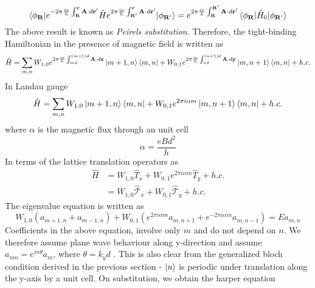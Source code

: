 \begin{equation}
 \braket{\phi_{\mathbf{R}}|e^{-2\pi \frac{ie}{h}\int_{\mathbf{R}}^{\mathbf{r}}{\mathbf{A}\cdot d\mathbf{r}'}}\hat{H}e^{2\pi \frac{ie}{h}\int_{\mathbf{R}'}^{\mathbf{r}}{\mathbf{A}\cdot d\mathbf{r}'}}|\phi_{\mathbf{R}'}} = e^{2\pi \frac{ie}{h}\int_{\mathbf{R}}^{\mathbf{R}'}{\mathbf{A}\cdot d\mathbf{r}'}} \braket{\phi_{\mathbf{R}}|\hat{H}_{0}|\phi_{\mathbf{R}'}}
\end{equation} The above result is known as \emph{Peirels substitution}. Therefore, the tight-binding Hamiltonian in the presence of magnetic field is written as \cite{hofstadter1976energy,bernevig2013topological,fischbeck1970theory}
\begin{equation}
 \hat{H} = \sum_{m, n} W_{1,0}e^{2\pi \frac{ie}{h}\int_{md}^{(m+1)d}{\mathbf{A}\cdot d\mathbf{x}}}\ket{m+1, n}\bra{m, n} + W_{0,1}e^{2\pi \frac{ie}{h}\int_{nd}^{(n+1)d}{\mathbf{A}\cdot d\mathbf{y}}}\ket{m, n+1}\bra{m, n} + h.c.
\end{equation}
In Landau gauge
\begin{equation}
 \label{chap_6:harperprev}\hat{H} = \sum_{m, n} W_{1,0}\ket{m+1, n}\bra{m, n} + W_{0,1}e^{2\pi i \alpha m}\ket{m, n+1}\bra{m, n} + h.c.
\end{equation} where $\alpha$ is the magnetic flux through an unit cell
\begin{equation}
 \alpha = \frac{eBd^2}{h}
\end{equation}
In terms of the lattice translation operators as
\begin{align}
 \hat{H} &= W_{1,0}\hat{T}_{x} + W_{0,1}e^{2\pi i \alpha m}\hat{T}_{y} + h.c. \\
 &= W_{1,0}\hat{\mathcal{T}}_{x} + W_{0,1}\hat{\mathcal{T}}_{y} + h.c.
\end{align}
The eigenvalue equation is written as
\begin{equation}
 W_{1,0}(a_{m+1, n} + a_{m-1, n}) + W_{0, 1}(e^{2\pi i \alpha m}a_{m, n+1} + e^{-2\pi i \alpha m}a_{m, n-1}) = Ea_{m, n}
\end{equation}
Coefficients in the above equation, involve only $m$ and do not depend on $n$. We therefore assume plane wave behaviour along y-direction and assume
$a_{mn} = e^{in\theta}a_m$, where $\theta = k_y d$ \cite{hofstadter1976energy,stockmann2006quantum}. This is also clear from the generalized bloch condition derived in the previous section - $\ket{u}$ is periodic 
under translation along the y-axis by a unit cell. On substitution, we obtain the harper equation \cite{harper1955general,harper1955single,hofstadter1976energy,stockmann2006quantum}
